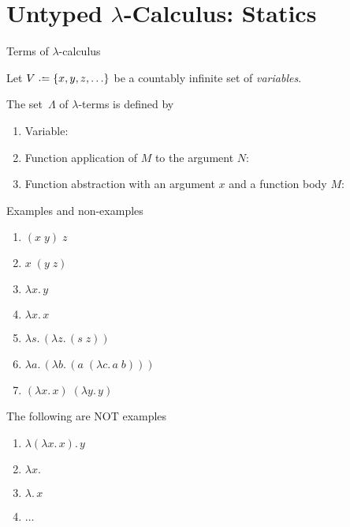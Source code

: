 \section{Untyped $\lambda$-Calculus: Statics}

\begin{frame}{Terms of $\lambda$-calculus}

Let $V \defeq \{ x, y, z, \ldots \}$ be a countably infinite set of
\emph{variables}.
\begin{definition}
   The set~$\Lambda$ of \alert{$\lambda$-terms} is defined
  by
  \begin{enumerate}
    \item Variable:
      \begin{prooftree}
      \end{prooftree}

    \item Function application of $M$ to the argument $N$:
      \begin{prooftree}
      \end{prooftree}

    \item Function abstraction with an argument $x$ and a function body $M$:
      \begin{prooftree}
      \end{prooftree}
  \end{enumerate}
\end{definition}
\end{frame}

\begin{frame}{Examples and non-examples}
  \begin{enumerate}
    \item $(x\;y)\;z$
    \item $x\;(y\; z)$
    \item $\lambda x.\, y$
    \item $\lambda x.\, x$
    \item $\lambda s.\,(\lambda z.\, (s \;z))$
    \item $\lambda a.\,(\lambda b.\, (a\;(\lambda c.\, a\; b)))$
    \item $(\lambda x.\, x)\;(\lambda y.\, y)$
  \end{enumerate}
  The following are NOT examples
  \begin{enumerate}
    \item $\lambda (\lambda x.\, x).\, y$
    \item $\lambda x. $
    \item $\lambda.\, x$
    \item $\dots$
  \end{enumerate}
\end{frame}

